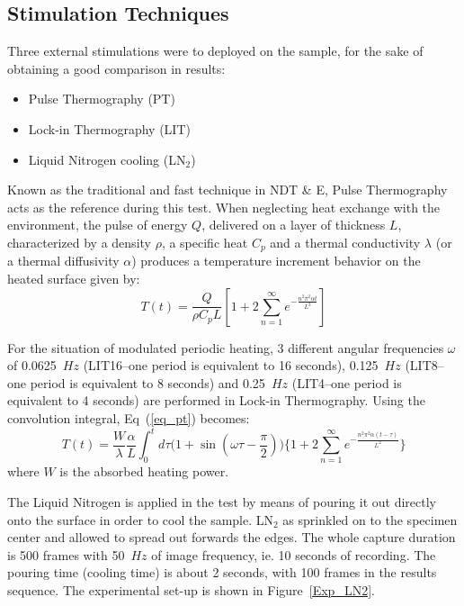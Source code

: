 \documentclass[]{spie}  %
\begin{document}
\subsection{Stimulation Techniques} %
\label{sub:stimulation_techniques}
Three external stimulations were to deployed on the sample, for the sake of  obtaining a good comparison in results: 
\begin{itemize}
   \item Pulse Thermography (PT) 
   \item Lock-in Thermography (LIT)
   \item Liquid Nitrogen cooling (LN$_2$)
\end{itemize}
Known as the traditional and fast technique in NDT \& E, Pulse Thermography acts as the reference during this test. When neglecting heat exchange with the environment, the pulse of energy $Q$, delivered on a layer of thickness $L$, characterized by a density $\rho$, a specific heat $C_p$ and a thermal conductivity $\lambda$ (or a thermal diffusivity $\alpha$) produces a temperature increment behavior on the heated surface given by:
\begin{equation}
   T(t) = \frac{Q}{\rho C_p L}[1+2\sum_{n=1}^{\infty} e^{-\frac{n^2 \pi ^2\alpha t}{L^2}}]
   \label{eq_pt}
\end{equation}

For the situation of modulated periodic heating, 3 different angular frequencies $\omega$ of 0.0625~$Hz$ (LIT16--one period is equivalent to 16 seconds), 0.125~$Hz$ (LIT8--one period is equivalent to 8 seconds) and 0.25~$Hz$ (LIT4--one period is equivalent to 4 seconds) are performed in Lock-in Thermography. 
Using the convolution integral, Eq~(\ref{eq_pt}) becomes:
\begin{equation}
   T(t) = \frac{W}{\lambda}\frac{\alpha}{L}\int_0^t d\tau \Big(1+\sin(\omega \tau - \frac{\pi}{2})\Big)\Big\{1+2\sum_{n=1}^{\infty} e^{-\frac{n^2 \pi ^2\alpha(t-\tau)}{L^2}}\Big\}
\end{equation}
where $W$ is the absorbed heating power.

The Liquid Nitrogen is applied in the test by means of pouring it out directly onto the surface in order to cool the sample. LN$_2$ as sprinkled on to  the specimen center and allowed to spread out forwards the edges. The whole capture duration is 500 frames with 50~$Hz$ of image frequency, ie. 10 seconds of recording. The pouring time (cooling time) is about 2 seconds, with 100 frames in the results sequence. The experimental set-up is shown in Figure~\ref{Exp_LN2}.
\end{document}
